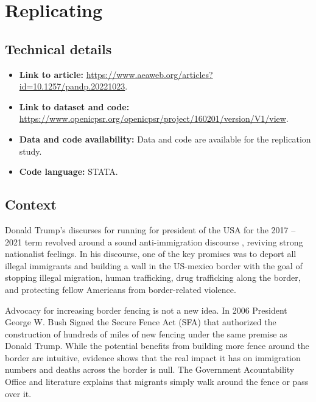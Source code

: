 \documentclass[titlepage]{article}
\theoremstyle{plain}
\theoremstyle{plain}
\begin{document}
\section*{Replicating \cite{Bansak2022}}

\subsection*{Technical details}

\begin{itemize}
    \item \textbf{Link to article:} \href{https://www.aeaweb.org/articles?id=10.1257/pandp.20221023}{https://www.aeaweb.org/articles?id=10.1257/pandp.20221023}.
    \item \textbf{Link to dataset and code:}\\
     \href{https://www.openicpsr.org/openicpsr/project/160201/version/V1/view}{https://www.openicpsr.org/openicpsr/project/160201/version/V1/view}.
    \item \textbf{Data and code availability:} Data and code are available for the replication study.
    \item \textbf{Code language:} STATA.
\end{itemize}

\subsection*{Context}

Donald Trump’s discurses for running for president of the USA for the 2017 – 2021 term revolved around a sound anti-immigration discourse , reviving strong nationalist feelings. In his discourse, one of the key promises was to deport all illegal immigrants and building a wall in the US-mexico border with the goal of stopping illegal migration, human trafficking, drug trafficking along the border, and protecting fellow Americans from border-related violence.

Advocacy for increasing border fencing is not a new idea. In 2006 President George W. Bush Signed the Secure Fence Act (SFA) that authorized the construction of hundreds of miles of new fencing under the same premise as Donald Trump.
While the potential benefits from building more fence around the border are intuitive, evidence shows that the real impact it has on immigration numbers and deaths across the border is null. The Government Acountability Office and literature explains that migrants simply walk around the fence or pass over it.
\end{document}

